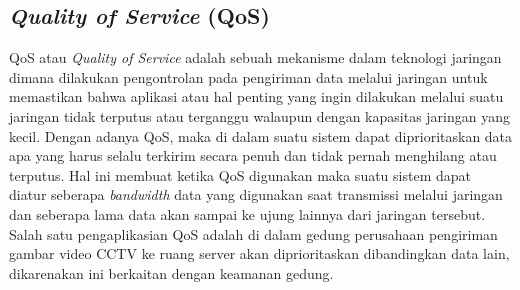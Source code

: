 

\subsection{\emph{Quality of Service} (QoS)}

QoS atau \emph{Quality of Service} adalah sebuah mekanisme dalam teknologi jaringan dimana dilakukan pengontrolan pada pengiriman data melalui jaringan untuk memastikan bahwa aplikasi atau hal penting yang ingin dilakukan melalui suatu jaringan tidak terputus atau terganggu walaupun dengan kapasitas jaringan yang kecil. Dengan adanya QoS, maka di dalam suatu sistem dapat diprioritaskan data apa yang harus selalu terkirim secara penuh dan tidak pernah menghilang atau terputus. Hal ini membuat ketika QoS digunakan maka suatu sistem dapat diatur seberapa \emph{bandwidth} data yang digunakan saat transmissi melalui jaringan dan seberapa lama data akan sampai ke ujung lainnya dari jaringan tersebut. Salah satu pengaplikasian QoS adalah di dalam gedung perusahaan pengiriman gambar video CCTV ke ruang server akan diprioritaskan dibandingkan data lain, dikarenakan ini berkaitan dengan keamanan gedung.

